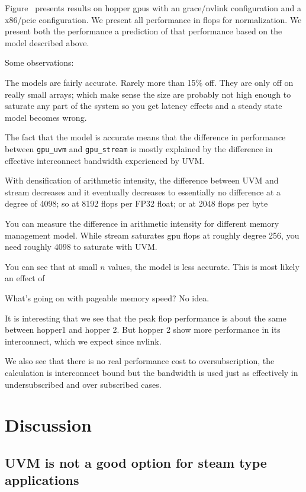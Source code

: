 \documentclass{article}
\begin{document}
Figure~\label{fig:perf-hopper} presents results on hopper gpus with an
grace/nvlink configuration and a x86/pcie configuration. We present
all performance in flops for normalization. We present both the
performance a prediction of that performance based on the model
described above.

Some observations:

The models are fairly accurate. Rarely more than 15\% off. They are
only off on really small arrays; which make sense the size are
probably not high enough to saturate any part of the system so you get
latency effects and a steady state model becomes wrong.

The fact that the model is accurate means that the difference in
performance between \texttt{gpu\_uvm} and \texttt{gpu\_stream} is
mostly explained by the difference in effective interconnect bandwidth
experienced by UVM.

With densification of arithmetic intensity, the difference between UVM
and stream decreases and it eventually decreases to essentially no
difference at a degree of 4098; so at 8192 flops per FP32 float; or at
2048 flops per byte

You can measure the difference in arithmetic intensity for different
memory management model. While stream saturates gpu flops at roughly
degree 256, you need roughly 4098 to saturate with UVM.

You can see that at small $n$ values, the model is less accurate. This
is most likely an effect of

What's going on with pageable memory speed? No idea.

It is interesting that we see that the peak flop performance is about
the same between hopper1 and hopper 2. But hopper 2 show more
performance in its interconnect, which we expect since nvlink.

We also see that there is no real performance cost to
oversubscription, the calculation is interconnect bound but the
bandwidth is used just as effectively in undersubscribed and over
subscribed cases.

\section{Discussion}

\subsection{UVM is not a good option for steam type applications}
\end{document}
